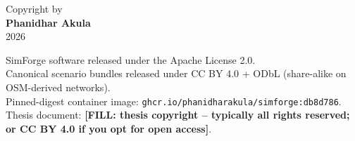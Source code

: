 \thispagestyle{empty}
\vspace*{\fill}
\begin{center}
Copyright by \\[0.5em]
\textbf{Phanidhar Akula} \\[0.5em]
2026
\end{center}
\vspace{0.3in}
\begin{center}
\footnotesize
SimForge software released under the Apache License 2.0. \\
Canonical scenario bundles released under CC BY 4.0 + ODbL (share-alike on OSM-derived networks). \\
Pinned-digest container image: \texttt{ghcr.io/phanidharakula/simforge:db8d786}. \\
Thesis document: \textbf{[FILL: thesis copyright -- typically all rights reserved; or CC BY 4.0 if you opt for open access]}.
\end{center}
\vspace*{\fill}
\clearpage
